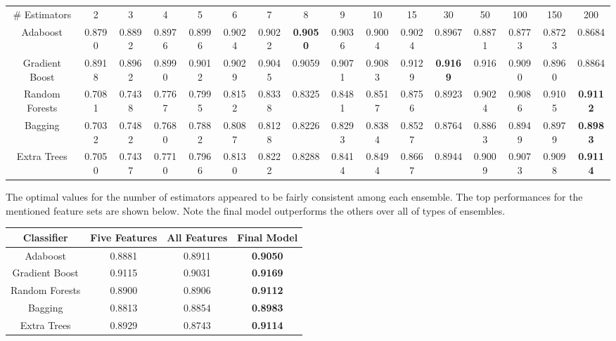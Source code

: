 \documentclass{article} %
\begin{document}
\begin{adjustbox}{width=\textwidth,totalheight=\textheight,keepaspectratio}
\begin{tabular}{c | c c c c c c c c c c c c c c c}
\# Estimators & 2 & 3 & 4 & 5 & 6 & 7 & 8 & 9 & 10 & 15 & 30 & 50 & 100 & 150 & 200\\
Adaboost & 0.8790 & 0.8892 & 0.8976 & 0.8996 & 0.9024 & 0.9022 & \textbf{0.9050} & 0.9036 & 0.9004 & 0.9024 & 0.8967 & 0.8871 & 0.8773 & 0.8723 & 0.8684\\
\hline
Gradient Boost & 0.8918 & 0.8962 & 0.8990 & 0.9012 & 0.9029 & 0.9045 & 0.9059 & 0.9071 & 0.9083 & 0.9129 & \textbf{0.9169} & 0.916 & 0.9090 & 0.8960 & 0.8864\\
Random Forests & 0.7081 & 0.7438 & 0.7767 & 0.7995 & 0.8152 & 0.8338 & 0.8325 & 0.8481 & 0.8517 & 0.8756 & 0.8923 & 0.9024 & 0.9086 & 0.9105 & \textbf{0.9112}\\
Bagging & 0.7032 & 0.7482 & 0.7680 & 0.7882 & 0.8087 & 0.8128 & 0.8226 & 0.8293 & 0.8384 & 0.8527 & 0.8764 & 0.8863 & 0.8949 & 0.8979 & \textbf{0.8983}\\
Extra Trees & 0.7050 & 0.7437 & 0.7710 & 0.7966 & 0.8130 & 0.8222 & 0.8288 & 0.8414 & 0.8494 & 0.8667 & 0.8944 & 0.9009 & 0.9073 & 0.9098 & \textbf{0.9114}
\end{tabular}
\end{adjustbox}

The optimal values for the number of estimators appeared to be fairly consistent
among each ensemble. The top performances for the mentioned feature sets are
shown below. Note the final model outperforms the others over all of types of
ensembles.

\begin{tabular}{c|ccc}
Classifier & Five Features & All Features & Final Model\\
\hline
Adaboost & 0.8881 & 0.8911 & \textbf{0.9050}\\
Gradient Boost & 0.9115 & 0.9031 & \textbf{0.9169}\\
Random Forests & 0.8900 & 0.8906 & \textbf{0.9112}\\
Bagging & 0.8813 & 0.8854 & \textbf{0.8983}\\
Extra Trees & 0.8929 & 0.8743 & \textbf{0.9114}
\end{tabular}
\end{document}
